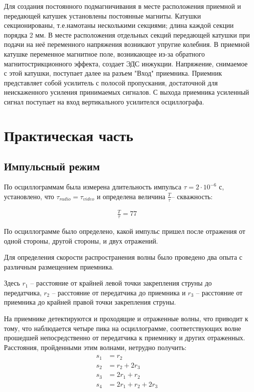 Для создания постоянного подмагничивания в месте расположения приемной и передающей катушек установлены постоянные магниты. Катушки секционированы, т.е.намотаны несколькими секциями; длина каждой секции порядка 2 мм. В месте расположения отдельных секций передающей катушки при подачи на неё переменного напряжения возникают упругие колебния. В приемной катушке переменное магнитное поле, возникающее из-за обратного магнитострикционного эффекта, создает ЭДС инжукции. Напряжение, снимаемое с этой катушки, поступает далее на разъем "Вход" приемника. Приемник представляет собой усилитель с полосой пропускания, достаточной для неискаженного усиления принимаемых сигналов. С выхода приемника усиленный сигнал поступает на вход вертикального усилителся осциллографа.

\section{Практическая часть}
\subsection{Импульсный режим}
По осциллограммам была измерена длительность импульса $\tau=2\cdot10^{-6}$ с, установлено, что $\tau_{radio}=\tau_{video}$  и определена величина $\frac{T}{\tau}$-- скважность:

\begin{gather*}
	\frac{T}{\tau}=77
\end{gather*}

По осциллограмме было определено, какой импульс пришел после отражения от одной стороны, другой стороны, и двух отражений.

Для определения скорости распространения волны было проведено два опыта с различным размещением приемника.



Здесь $r_1$ -- расстояние от крайней левой точки закрепления струны до передатчика, $r_2$ -- расстояние от передатчика до приемника и $r_3$ -- расстояние от приемника до крайней правой точки закрепления струны.

На приемнике детектируются и проходящие и отраженные волны, что приводит к тому, что наблюдается четыре пика на осциллограмме, соответствующих волне прошедшей непосредственно от передатчика к приемнику и других отраженных. Расстояния, пройденными этим волнами, нетрудно получить:
\begin{gather}
\begin{aligned}
	s_1&=r_2\\
	s_2&=r_2+2r_3\\
	s_3&=2r_1+r_2\\
	s_4&=2r_1+r_2+2r_3\\
\end{aligned}
\end{gather}   

